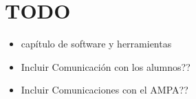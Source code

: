 %
%
%
%

\cleardoublepage
\chapter{TODO}
\label{chap:TODO}

\begin{itemize}
	\item cap\'itulo de software y herramientas
	\item Incluir Comunicaci\'on con los alumnos??
	\item Incluir Comunicaciones con el AMPA??
\end{itemize}